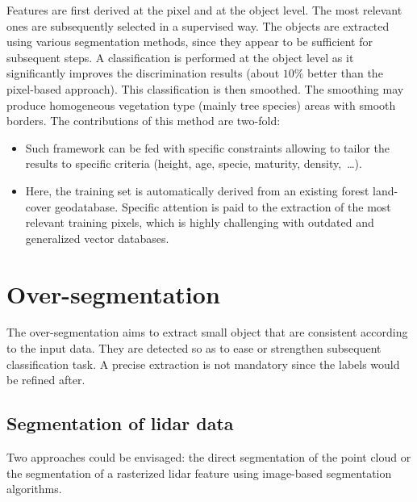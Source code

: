 Features are first derived at the pixel and at the object level. The most relevant ones are subsequently selected in a supervised way. The objects are extracted using various segmentation methods, since they appear to be sufficient for subsequent steps. A classification is performed at the object level as it significantly improves the discrimination results (about $10\%$ better than the pixel-based approach). This classification is then smoothed. The smoothing may produce homogeneous vegetation type (mainly tree species) areas with smooth borders. The contributions of this method are two-fold:
\begin{itemize}
\item Such framework can be fed with specific constraints allowing to tailor the results to specific criteria (height, age, specie, maturity, density,~\ldots).
\item Here, the training set is automatically derived from an existing forest land-cover geodatabase. Specific attention is paid to the extraction of the most relevant training pixels, which is highly challenging with outdated and generalized vector databases.
\end{itemize}

\section{Over-segmentation}
The over-segmentation aims to extract small object that are consistent according to the input data. They are detected so as to ease or strengthen subsequent classification task. A precise extraction is not mandatory since the labels would be refined after.

\subsection{Segmentation of lidar data}
Two approaches could be envisaged: the direct segmentation of the point cloud or the segmentation of a rasterized lidar feature using image-based segmentation algorithms. \\

